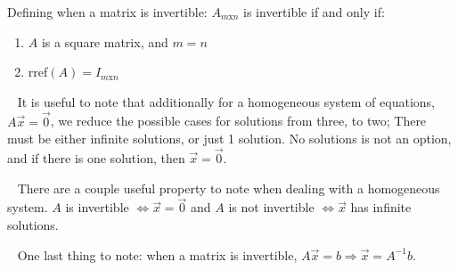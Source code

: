 \documentclass[11pt]{article}
\begin{document}
Defining when a matrix is invertible:
$A_{m\text{x}n}$ is invertible if and only if:
\begin{enumerate}
\item $A$ is a square matrix, and $m=n$
\item rref$(A)=I_{m\text{x}n}$
\end{enumerate}

$\,\,\,$ It is useful to note that additionally for a homogeneous system of equations, $A\vec{x}=\vec{0}$, we reduce the possible cases for solutions from three, to two; There must be either infinite solutions, or just 1 solution. No solutions is not an option, and if there is one solution, then $\vec{x}=\vec{0}$.

$\,\,\,$ There are a couple useful property to note when dealing with a homogeneous system. $A$ is invertible $\Leftrightarrow \vec{x}=\vec{0}$ and $A$ is not invertible $\Leftrightarrow \vec{x}$ has infinite solutions.

$\,\,\,$ One last thing to note: when a matrix is invertible, $A\vec{x}=b\Rightarrow\vec{x}=A^{-1}b$.
\end{document}
